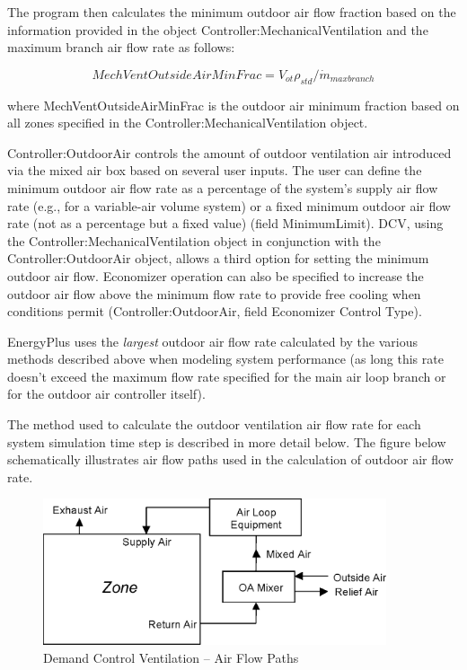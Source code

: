 The program then calculates the minimum outdoor air flow fraction based on the information provided in the object Controller:MechanicalVentilation and the maximum branch air flow rate as follows:

\begin{equation}
MechVentOutsideAirMinFrac = {V_{ot}} {\rho_{std}} / {\dot m_{maxbranch}}
\end{equation}

where MechVentOutsideAirMinFrac is the outdoor air minimum fraction based on all zones specified in the Controller:MechanicalVentilation object.

Controller:OutdoorAir controls the amount of outdoor ventilation air introduced via the mixed air box based on several user inputs. The user can define the minimum outdoor air flow rate as a percentage of the system's supply air flow rate (e.g., for a variable-air volume system) or a fixed minimum outdoor air flow rate (not as a percentage but a fixed value) (field MinimumLimit). DCV, using the Controller:MechanicalVentilation object in conjunction with the Controller:OutdoorAir object, allows a third option for setting the minimum outdoor air flow. Economizer operation can also be specified to increase the outdoor air flow above the minimum flow rate to provide free cooling when conditions permit (Controller:OutdoorAir, field Economizer Control Type).

EnergyPlus uses the \emph{largest} outdoor air flow rate calculated by the various methods described above when modeling system performance (as long this rate doesn't exceed the maximum flow rate specified for the main air loop branch or for the outdoor air controller itself).

The method used to calculate the outdoor ventilation air flow rate for each system simulation time step is described in more detail below. The figure below schematically illustrates air flow paths used in the calculation of outdoor air flow rate.

\begin{figure}[hbtp] %
\centering
\includegraphics[width=0.9\textwidth, height=0.9\textheight, keepaspectratio=true]{media/image4731.png}
\caption{Demand Control Ventilation -- Air Flow Paths \protect \label{fig:demand-control-ventilation-air-flow-paths}}
\end{figure}

